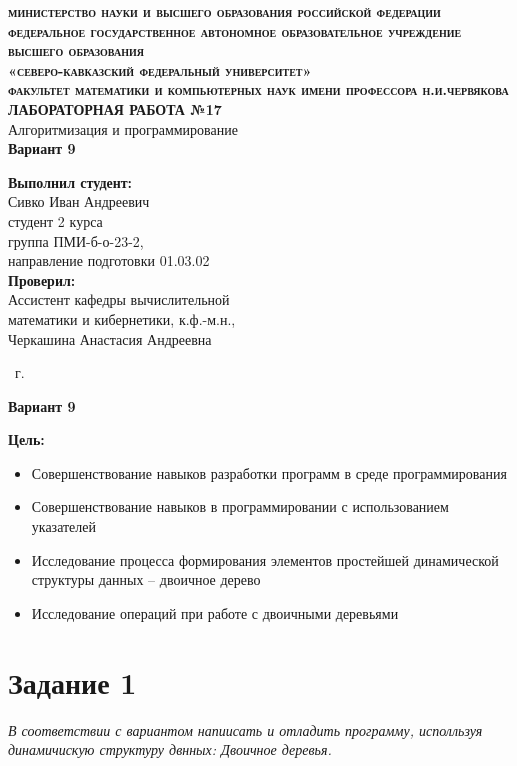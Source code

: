 \documentclass[a4paper,12pt]{article}
\begin{document}
\begin{titlepage}
\begin{center}
{\large\scshape\bfseries
министерство науки и высшего образования российской федерации\\
федеральное государственное автономное образовательное учреждение высшего образования\\
«северо-кавказский федеральный университет»\\
факультет математики и компьютерных наук имени профессора н.и.червякова}
\vfill
\Large{\textbf{ЛАБОРАТОРНАЯ РАБОТА №17}}\\[2mm]
\large{Алгоритмизация и программирование}\\[6mm]
\Large{\textbf{Вариант 9}}\\[20mm]
\end{center}
\begin{flushright}
\textbf{Выполнил студент:}\\
Сивко Иван Андреевич\\
студент 2 курса\\
группа ПМИ-б-о-23-2,\\
направление подготовки 01.03.02\\[5mm]
\textbf{Проверил:}\\
Ассистент кафедры вычислительной\\
математики и кибернетики, к.ф.-м.н.,\\
Черкашина Анастасия Андреевна
\end{flushright}
\vfill
\centerline{ \the\year\ г. }
\end{titlepage}


\centerline{\large\textbf{Вариант 9}}
\textbf{Цель:}
\begin{small}
\begin{itemize}
\item Совершенствование навыков разработки программ в среде программирования
\item Совершенствование навыков в программировании с использованием указателей
\item Исследование процесса формирования элементов простейшей динамической структуры данных – двоичное дерево
\item Исследование операций при работе с двоичными деревьями
\end{itemize}
\end{small}

\section*{Задание 1}
\textit{В соответствии с вариантом напиисать и отладить программу, исполльзуя
динамичискую структуру двнных: Двоичное деревья.}
\renewcommand{\thesubsection}{\arabic{subsection}} %
\setcounter{subsection}{0} %
\end{document}
